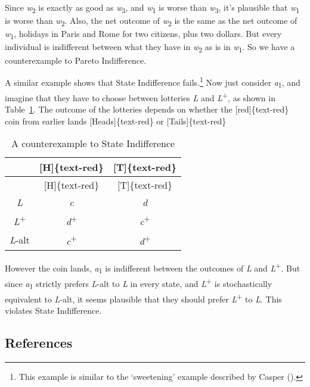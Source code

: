 \documentclass[
  11pt,
  letterpaper,
  DIV=11,
  numbers=noendperiod,
  twoside]{scrartcl}
\begin{document}
Since \emph{w}\textsubscript{2} is exactly as good as
\emph{w}\textsubscript{3}, and \emph{w}\textsubscript{1} is worse than
\emph{w}\textsubscript{3}, it's plausible that \emph{w}\textsubscript{1}
is worse than \emph{w}\textsubscript{2}. Also, the net outcome of
\emph{w}\textsubscript{2} is the same as the net outcome of
\emph{w}\textsubscript{1}, holidays in Paris and Rome for two citizens,
plus two dollars. But every individual is indifferent between what they
have in \emph{w}\textsubscript{2} as is in \emph{w}\textsubscript{1}. So
we have a counterexample to Pareto Indifference.

A similar example shows that State Indifference fails.\footnote{This
  example is similar to the `sweetening' example described by Casper
  ().} Now just consider
\emph{a}\textsubscript{1}, and imagine that they have to choose between
lotteries \emph{L} and \emph{L}\textsuperscript{+}, as shown in
Table~\ref{tbl-state-indifference}. The outcome of the lotteries depends
on whether the {[}red{]}\{text-red\} coin from earlier lands
{[}Heads{]}\{text-red\} or {[}Tails{]}\{text-red\}

\begin{longtable}[]{@{}ccc@{}}
\caption{A counterexample to State
Indifference}\label{tbl-state-indifference}\tabularnewline
\toprule\noalign{}
& {[}H{]}\{text-red\} & {[}T{]}\{text-red\} \\
\midrule\noalign{}
\endfirsthead
\toprule\noalign{}
& {[}H{]}\{text-red\} & {[}T{]}\{text-red\} \\
\midrule\noalign{}
\endhead
\bottomrule\noalign{}
\endlastfoot
\emph{L} & \emph{c} & \emph{d} \\
\emph{L}\textsuperscript{+} & \emph{d}\textsuperscript{+} &
\emph{c}\textsuperscript{+} \\
\emph{L}-alt & \emph{c}\textsuperscript{+} &
\emph{d}\textsuperscript{+} \\
\end{longtable}

However the coin lands, \emph{a}\textsubscript{1} is indifferent between
the outcomes of \emph{L} and \emph{L}\textsuperscript{+}. But since
\emph{a}\textsubscript{1} strictly prefers \emph{L}-alt to \emph{L} in
every state, and \emph{L}\textsuperscript{+} is stochastically
equivalent to \emph{L}-alt, it seems plausible that they should prefer
\emph{L}\textsuperscript{+} to \emph{L}. This violates State
Indifference.

\subsection*{References}\label{references}
\end{document}

